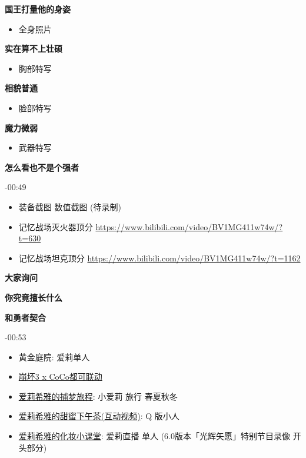 \documentclass[a4paper]{article}
\begin{document}
\textbf{国王打量他的身姿}

\begin{itemize}
    \item 全身照片
\end{itemize}

\textbf{实在算不上壮硕}

\begin{itemize}
    \item 胸部特写
\end{itemize}

\textbf{相貌普通}

\begin{itemize}
    \item 脸部特写
\end{itemize}

\textbf{魔力微弱}

\begin{itemize}
    \item 武器特写
\end{itemize}

\textbf{怎么看也不是个强者}

-00:49

\begin{itemize}
    \item 装备截图 数值截图 (待录制)
    \item 记忆战场灭火器顶分 \url{https://www.bilibili.com/video/BV1MG411w74w/?t=630}
    \item 记忆战场坦克顶分 \url{https://www.bilibili.com/video/BV1MG411w74w/?t=1162}
\end{itemize}

\textbf{大家询问}

\textbf{你究竟擅长什么}

\textbf{和勇者契合}

-00:53

\begin{itemize}
    \item 黄金庭院: 爱莉单人
    \item \href{https://www.bilibili.com/video/BV1j84y1D7uf/}{崩坏3 x CoCo都可联动}
    \item \href{https://www.bilibili.com/video/BV1ZW4y1t7Zf/}{爱莉希雅的捕梦旅程}: 小爱莉 旅行 春夏秋冬
    \item \href{https://www.bilibili.com/video/BV1Ta411Z7KE/}{爱莉希雅的甜蜜下午茶(互动视频)}: Q 版小人
    \item \href{https://www.bilibili.com/video/BV12T411w7CN/}{爱莉希雅的化妆小课堂}: 爱莉直播 单人 (6.0版本「光辉矢愿」特别节目录像 开头部分)
\end{itemize}
\end{document}
